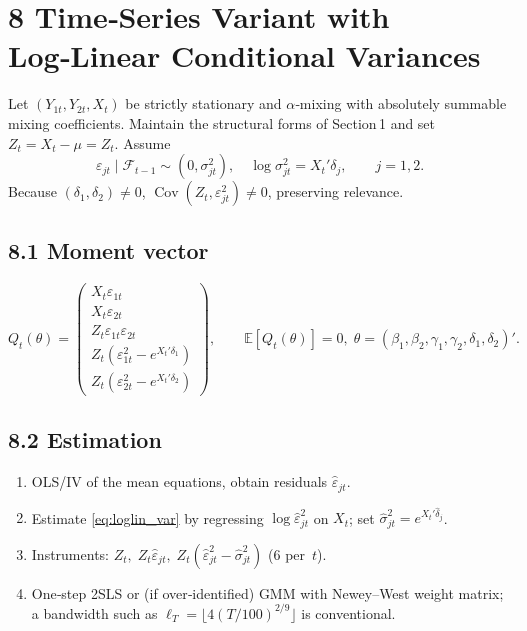 \documentclass{article}
\newcommand{\E}{\mathbb{E}}
\newcommand{\cov}{\operatorname{Cov}}
\theoremstyle{plain}
\begin{document}
\section*{8 \quad Time‑Series Variant with Log‑Linear Conditional Variances}
\label{sec:TimeSeries}

Let $(Y_{1t},Y_{2t},X_t)$ be strictly stationary and
$\alpha$‑mixing with absolutely summable mixing coefficients.
Maintain the structural forms of Section 1 and set $Z_t=X_t-\mu=Z_t$.
Assume
\begin{equation}\label{eq:loglin_var}
\varepsilon_{jt}\mid\mathcal F_{t-1}\sim(0,\sigma_{jt}^2),\quad
\log\sigma_{jt}^2=X_t'\delta_j,\qquad j=1,2.
\end{equation}
Because $(\delta_1,\delta_2)\neq0$,
$\cov(Z_t,\varepsilon_{jt}^2)\neq0$, preserving relevance.

\vspace{-0.5em}
\subsection*{8.1 \; Moment vector}

\[
Q_t(\theta)=
\begin{pmatrix}
X_t\varepsilon_{1t}\\[2pt]
X_t\varepsilon_{2t}\\[2pt]
Z_t\varepsilon_{1t}\varepsilon_{2t}\\[2pt]
Z_t\!\left(\varepsilon_{1t}^2-e^{X_t'\delta_1}\right)\\[2pt]
Z_t\!\left(\varepsilon_{2t}^2-e^{X_t'\delta_2}\right)
\end{pmatrix},
\qquad
\E[Q_t(\theta)]=0,\;
\theta=(\beta_1,\beta_2,\gamma_1,\gamma_2,\delta_1,\delta_2)'.
\]

\subsection*{8.2 \; Estimation}

\begin{enumerate}\itemsep2pt
\item OLS/IV of the mean equations, obtain residuals $\hat\varepsilon_{jt}$.
\item Estimate \eqref{eq:loglin_var} by regressing $\log\hat\varepsilon_{jt}^2$
      on $X_t$; set $\hat\sigma_{jt}^2=e^{X_t'\hat\delta_j}$.
\item Instruments: $Z_t,\;Z_t\hat\varepsilon_{jt},\;
      Z_t(\hat\varepsilon_{jt}^2-\hat\sigma_{jt}^2)$ ($6$ per~$t$).
\item One‑step 2SLS or (if over‑identified) GMM with
      Newey–West weight matrix;
      a bandwidth such as
      $\ell_T=\lfloor4(T/100)^{2/9}\rfloor$ is conventional.
\end{enumerate}
\end{document}
